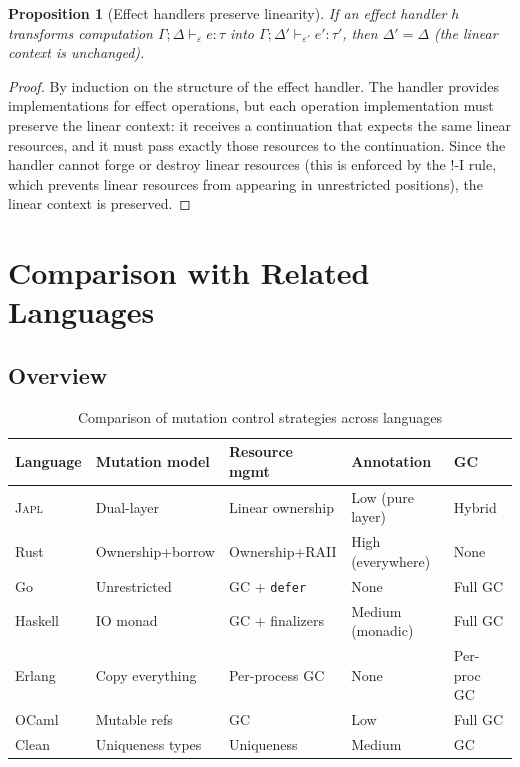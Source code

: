 \documentclass[11pt]{article}
\newtheorem{proposition}[theorem]{Proposition}
\newcommand{\JAPL}{\textsc{Japl}}
\newcommand{\bang}{{\mathop{!}}}
\begin{document}
\begin{proposition}[Effect handlers preserve linearity]\label{prop:effect-linear}
If an effect handler $h$ transforms computation
$\Gamma; \Delta \vdash_\varepsilon e : \tau$ into
$\Gamma; \Delta' \vdash_{\varepsilon'} e' : \tau'$,
then $\Delta' = \Delta$ (the linear context is unchanged).
\end{proposition}

\begin{proof}
By induction on the structure of the effect handler.  The handler
provides implementations for effect operations, but each operation
implementation must preserve the linear context: it receives a
continuation that expects the same linear resources, and it must
pass exactly those resources to the continuation.  Since the handler
cannot forge or destroy linear resources (this is enforced by the
$\bang$-I rule, which prevents linear resources from appearing in
unrestricted positions), the linear context is preserved.
\end{proof}


\section{Comparison with Related Languages}\label{sec:comparison}

\subsection{Overview}

\begin{table}[H]
\centering
\small
\caption{Comparison of mutation control strategies across languages}
\label{tab:comparison}
\begin{tabular}{@{}lllll@{}}
\toprule
\textbf{Language} & \textbf{Mutation model} & \textbf{Resource mgmt} &
  \textbf{Annotation} & \textbf{GC} \\
\midrule
\JAPL{} & Dual-layer & Linear ownership & Low (pure layer) & Hybrid \\
Rust & Ownership+borrow & Ownership+RAII & High (everywhere) & None \\
Go & Unrestricted & GC + \texttt{defer} & None & Full GC \\
Haskell & IO monad & GC + finalizers & Medium (monadic) & Full GC \\
Erlang & Copy everything & Per-process GC & None & Per-proc GC \\
OCaml & Mutable refs & GC & Low & Full GC \\
Clean & Uniqueness types & Uniqueness & Medium & GC \\
\bottomrule
\end{tabular}
\end{table}
\end{document}
